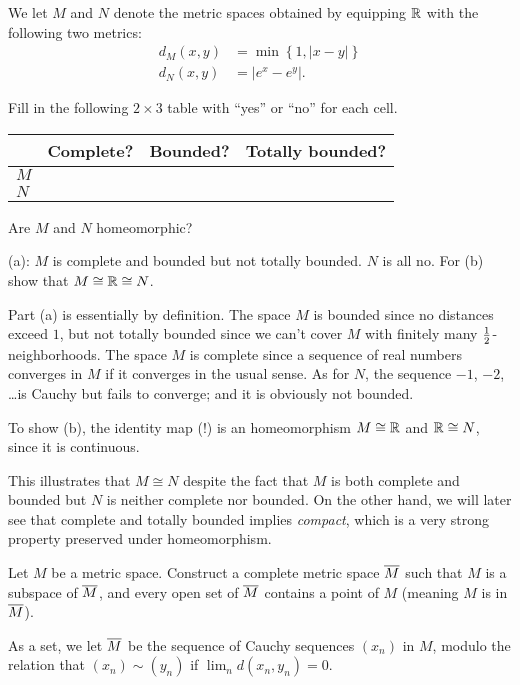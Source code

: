 \begin{problem}
	We let $M$ and $N$ denote the metric spaces obtained
	by equipping $\mathbb R$ with the following two metrics:
	\begin{align*}
		d_M(x,y) &= \min \left\{ 1, \left\lvert x-y \right\rvert \right\} \\
		d_N(x,y) &= \left\lvert e^x - e^y \right\rvert.
	\end{align*}
	\begin{enumerate}[(a)]
		\ii Fill in the following $2 \times 3$ table
		with ``yes'' or ``no'' for each cell.
		\begin{center}
		\begin{tabular}[h]{l|ccc}
			& Complete? & Bounded? & Totally bounded? \\ \hline
			$M$ \\
			$N$ \\
		\end{tabular}
		\end{center}
		\ii Are $M$ and $N$ homeomorphic?
	\end{enumerate}
	\begin{hint}
		(a): $M$ is complete and bounded
		but not totally bounded. $N$ is all no.
		For (b) show that $M \cong \mathbb R \cong N$.
	\end{hint}
	\begin{sol}
		Part (a) is essentially by definition.
		The space $M$ is bounded since no distances exceed $1$,
		but not totally bounded since we can't cover $M$
		with finitely many $\frac{1}{2}$-neighborhoods.
		The space $M$ is complete since a sequence of real
		numbers converges in $M$ if it converges in the usual sense.
		As for $N$, the sequence $-1$, $-2$, \dots is Cauchy
		but fails to converge; and it is obviously not bounded.

		To show (b), the identity map (!) is an homeomorphism $M \cong \mathbb R$
		and $\mathbb R \cong N$, since it is continuous.

		This illustrates that $M \cong N$ despite the fact
		that $M$ is both complete and bounded
		but $N$ is neither complete nor bounded.
		On the other hand, we will later see that complete
		and totally bounded implies \emph{compact},
		which is a very strong property preserved under homeomorphism.
	\end{sol}
\end{problem}


\begin{dproblem}
	\yod
	\label{prob:completion}
	Let $M$ be a metric space.
	Construct a complete metric space $\overline M$
	such that $M$ is a subspace of $\overline M$,
	and every open set of $\overline M$ contains a point of $M$
	(meaning $M$ is  in $\overline M$).
	\begin{hint}
		As a set, we let $\overline M$ be the sequence of Cauchy
		sequences $(x_n)$ in $M$, modulo the relation that
		$(x_n) \sim (y_n)$ if $\lim_n d(x_n, y_n) = 0$.
	\end{hint}
\end{dproblem}

